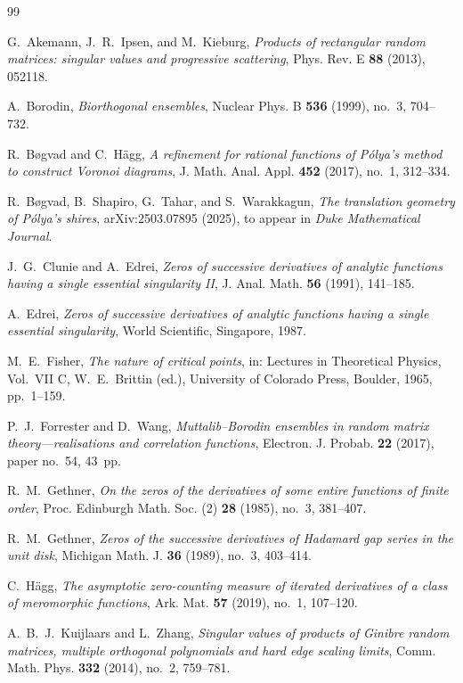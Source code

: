 \documentclass[reqno]{article}
\theoremstyle{definition}
\theoremstyle{remark}
\theoremstyle{plain}
\begin{document}
\begin{thebibliography}{99}

G.~Akemann, J.~R.~Ipsen, and M.~Kieburg,
\emph{Products of rectangular random matrices: singular values and progressive scattering},
Phys. Rev. E \textbf{88} (2013), 052118.

A.~Borodin,
\emph{Biorthogonal ensembles},
Nuclear Phys. B \textbf{536} (1999), no.~3, 704--732.

R.~B\o gvad and C.~H\"agg,
\emph{A refinement for rational functions of P\'olya's method to
construct Voronoi diagrams},
J. Math. Anal. Appl. \textbf{452} (2017), no.~1, 312--334.

 R.~B\o gvad, B.~Shapiro, G.~Tahar, and S.~Warakkagun,
\emph{The translation geometry of P\'olya's shires},
arXiv:2503.07895 (2025), to appear in \textit{Duke Mathematical Journal}.

J.~G.~Clunie and A.~Edrei,
\emph{Zeros of successive derivatives of analytic functions having a single essential singularity II},
J. Anal. Math. \textbf{56} (1991), 141--185.

A.~Edrei,
\emph{Zeros of successive derivatives of analytic functions having a single essential singularity},
World Scientific, Singapore, 1987.

M.~E.~Fisher,
\emph{The nature of critical points},
in: Lectures in Theoretical Physics, Vol.~VII C,
W.~E.~Brittin (ed.),
University of Colorado Press, Boulder, 1965, pp.~1--159.

P.~J.~Forrester and D.~Wang,
\emph{Muttalib--Borodin ensembles in random matrix theory---realisations and correlation functions},
Electron. J. Probab. \textbf{22} (2017), paper no.~54, 43~pp.

R.~M.~Gethner,
\emph{On the zeros of the derivatives of some entire functions of finite order},
Proc. Edinburgh Math. Soc. (2) \textbf{28} (1985), no.~3, 381--407.

R.~M.~Gethner,
\emph{Zeros of the successive derivatives of Hadamard gap series in the unit disk},
Michigan Math. J. \textbf{36} (1989), no.~3, 403--414.

C.~H\"agg,
\emph{The asymptotic zero-counting measure of iterated derivatives of
a class of meromorphic functions},
Ark. Mat. \textbf{57} (2019), no.~1, 107--120.

A.~B.~J.~Kuijlaars and L.~Zhang,
\emph{Singular values of products of Ginibre random matrices, multiple orthogonal polynomials and hard edge scaling limits},
Comm. Math. Phys. \textbf{332} (2014), no.~2, 759--781.


\end{thebibliography}
\end{document}
